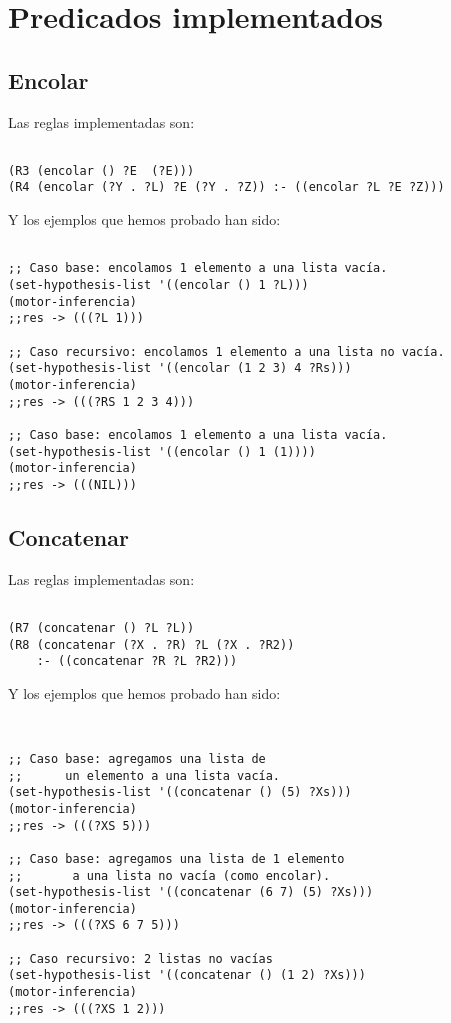 \documentclass[nochap]{apuntes}
\begin{document}
\section{Predicados implementados}

\subsection*{Encolar}
Las reglas implementadas son:\\
\begin{lstlisting}[frame=single]

(R3 (encolar () ?E  (?E)))
(R4 (encolar (?Y . ?L) ?E (?Y . ?Z)) :- ((encolar ?L ?E ?Z)))
\end{lstlisting}

Y los ejemplos que hemos probado han sido:\\

\begin{lstlisting}[frame=single]

;; Caso base: encolamos 1 elemento a una lista vacía.
(set-hypothesis-list '((encolar () 1 ?L)))
(motor-inferencia)
;;res -> (((?L 1)))

;; Caso recursivo: encolamos 1 elemento a una lista no vacía.
(set-hypothesis-list '((encolar (1 2 3) 4 ?Rs)))
(motor-inferencia)
;;res -> (((?RS 1 2 3 4)))

;; Caso base: encolamos 1 elemento a una lista vacía.
(set-hypothesis-list '((encolar () 1 (1))))
(motor-inferencia)
;;res -> (((NIL)))
\end{lstlisting}

\subsection*{Concatenar}
Las reglas implementadas son:\\
\begin{lstlisting}[frame=single]

(R7 (concatenar () ?L ?L))
(R8 (concatenar (?X . ?R) ?L (?X . ?R2)) 
	:- ((concatenar ?R ?L ?R2)))
\end{lstlisting}
Y los ejemplos que hemos probado han sido:\\

\begin{lstlisting}[frame=single]


;; Caso base: agregamos una lista de 
;;		un elemento a una lista vacía.
(set-hypothesis-list '((concatenar () (5) ?Xs)))
(motor-inferencia)
;;res -> (((?XS 5)))

;; Caso base: agregamos una lista de 1 elemento
;;		 a una lista no vacía (como encolar).
(set-hypothesis-list '((concatenar (6 7) (5) ?Xs)))
(motor-inferencia)
;;res -> (((?XS 6 7 5)))

;; Caso recursivo: 2 listas no vacías
(set-hypothesis-list '((concatenar () (1 2) ?Xs)))
(motor-inferencia)
;;res -> (((?XS 1 2)))
\end{lstlisting}
\end{document}
